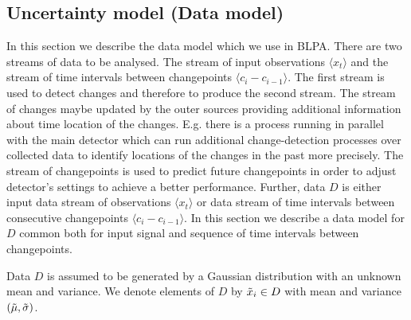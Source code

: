 \subsection{Uncertainty model (Data model)}
In this section we describe the data model which we use in BLPA.
There are two streams of data to be analysed.
The stream of input observations $\langle x_t \rangle$ and the stream of time intervals between changepoints  $\langle c_i - c_{i-1} \rangle$.
The first stream is used to detect changes and therefore to produce the second stream.
The stream of changes maybe updated by the outer sources providing additional information about time location of the changes.
E.g. there is a process running in parallel with the main detector which can run additional change-detection processes over collected data to identify locations of the changes in the past more precisely.
The stream of changepoints is used to predict future changepoints in order to adjust detector's settings to achieve a better performance.
Further, data $D$ is either input data stream of observations $\langle x_t \rangle$ or data stream of time intervals between consecutive changepoints $\langle c_i - c_{i-1} \rangle$.
In this section we describe a data model for $D$ common both for input signal and sequence of time intervals between changepoints.

Data $D$ is assumed to be generated by a Gaussian distribution with an unknown mean and variance.
We denote elements of $D$ by $\tilde{x}_i \in D$ with mean and variance $(\tilde{\mu}, \tilde{\sigma})$.

